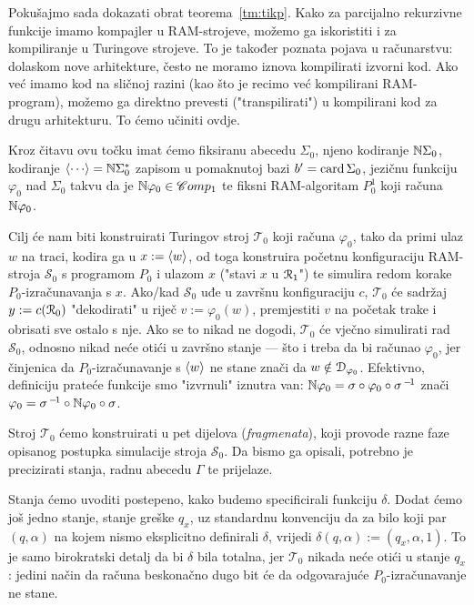 Pokušajmo sada dokazati obrat teorema~\ref{tm:tikp}. Kako za parcijalno rekurzivne funkcije imamo kompajler u RAM-strojeve, možemo ga iskoristiti i za kompiliranje u Turingove strojeve. To je također poznata pojava u računarstvu: dolaskom nove arhitekture, često ne moramo iznova kompilirati izvorni kod. Ako već imamo kod na sličnoj razini (kao što je recimo već kompilirani RAM-program), možemo ga direktno prevesti ("transpilirati") u kompilirani kod za drugu arhitekturu. To ćemo učiniti ovdje.

Kroz čitavu ovu točku imat ćemo fiksiranu abecedu $\Sigma_0$, njeno kodiranje ${\mathbb N}\Sigma_0$, kodiranje $\kr{\cdots}=\N\Sigma_0^*$ zapisom u pomaknutoj bazi $b'=\operatorname{card}\Sigma_0$, jezičnu funkciju $\varphi_0$ nad $\Sigma_0$ takvu da je ${\mathbb N}\varphi_0\in\mathscr Comp_1$ te fiksni RAM-algoritam $P_0^1$ koji računa ${\mathbb N}\varphi_0$.

Cilj će nam biti konstruirati Turingov stroj $\mathcal T_0$ koji računa $\varphi_0$, tako da primi ulaz $w$ na traci, kodira ga u $x:=\langle w\rangle$, od toga konstruira početnu konfiguraciju RAM-stroja $\mathcal S_0$ s programom $P_0$ i ulazom $x$ ("stavi $x$ u $\mathcal R_{1}$\!") te simulira redom korake $P_0$-izračunavanja s $x$. Ako\slash kad $\mathcal S_0$ uđe u završnu konfiguraciju $c$, $\mathcal T_0$ će sadržaj $y:=c(\mathcal R_{0})$ "dekodirati" u riječ $v:=\varphi_0(w)$, premjestiti $v$ na početak trake i obrisati sve ostalo s nje. Ako se to nikad ne dogodi, $\mathcal T_0$ će vječno simulirati rad $\mathcal S_0$, odnosno nikad neće otići u završno stanje --- što i treba da bi računao $\varphi_0$, jer činjenica da $P_0$-izračunavanje s $\langle w\rangle$ ne stane znači da $w\notin\mathcal D_{\varphi_0}$. Efektivno, definiciju prateće funkcije smo "izvrnuli" iznutra van: ${\mathbb N}\varphi_0=\sigma\circ\varphi_0\circ\sigma^{\,-\!1}$ znači $\varphi_0=\sigma^{\,-\!1}\circ{\mathbb N}\varphi_0\circ\sigma$.

Stroj $\mathcal T_0$ ćemo konstruirati u pet dijelova (\emph{fragmenata}), koji provode razne faze opisanog postupka simulacije stroja $\mathcal S_0$. Da bismo ga opisali, potrebno je precizirati stanja, radnu abecedu $\Gamma$ te prijelaze.

Stanja ćemo uvoditi postepeno, kako budemo specificirali funkciju $\delta$. Dodat ćemo još jedno stanje, stanje greške $q_x$, uz standardnu konvenciju da za bilo koji par $(q,\alpha)$ na kojem nismo eksplicitno definirali $\delta$, vrijedi $\delta(q,\alpha):=(q_x,\alpha,1)$. To je samo birokratski detalj da bi $\delta$ bila totalna, jer $\mathcal T_0$ nikada neće otići u stanje $q_x$: jedini način da računa beskonačno dugo bit će da odgovarajuće $P_0$-izračunavanje ne stane.

